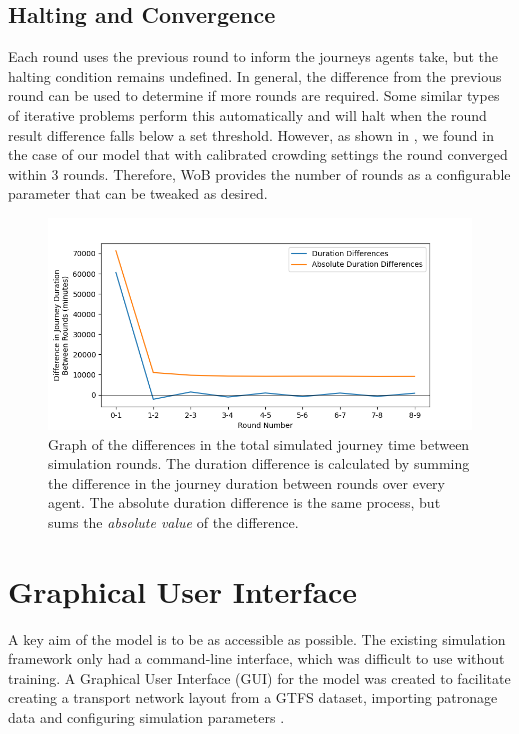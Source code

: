 \subsection{Halting and Convergence}
\label{subsec:convergence}
Each round uses the previous round to inform the journeys agents take, but the halting condition remains undefined. In general, the difference from the previous round can be used to determine if more rounds are required. Some similar types of iterative problems perform this automatically and will halt when the round result difference falls below a set threshold. However, as shown in , we found in the case of our model that with calibrated crowding settings the round converged within 3 rounds. Therefore, WoB provides the number of rounds as a configurable parameter that can be tweaked as desired. 

\begin{figure}[ht]
    \centering
    \includegraphics[width=\linewidth]{images/Construction/convergence.png}
    \caption[Simulation convergence]{Graph of the differences in the total simulated journey time between simulation rounds. The duration difference is calculated by summing the difference in the journey duration between rounds over every agent. The absolute duration difference is the same process, but sums the \emph{absolute value} of the difference.}
    \label{fig:simulation_convergence}
\end{figure}

\section{Graphical User Interface}
A key aim of the model is to be as accessible as possible. The existing simulation framework only had a command-line interface, which was difficult to use without training. A Graphical User Interface (GUI) for the model was created to facilitate creating a transport network layout from a GTFS dataset, importing patronage data and configuring simulation parameters \cite{mobilitydataReferenceGeneralTransit2024}.

